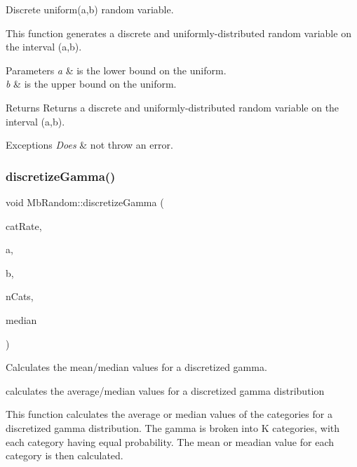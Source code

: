 Discrete uniform(a,b) random variable. 

This function generates a discrete and uniformly-\/distributed random variable on the interval (a,b).


\begin{DoxyParams}{Parameters}
{\em a} & is the lower bound on the uniform. \\
\hline
{\em b} & is the upper bound on the uniform. \\
\hline
\end{DoxyParams}
\begin{DoxyReturn}{Returns}
Returns a discrete and uniformly-\/distributed random variable on the interval (a,b). 
\end{DoxyReturn}

\begin{DoxyExceptions}{Exceptions}
{\em Does} & not throw an error. \\
\hline
\end{DoxyExceptions}
\mbox{\label{class_mb_random_ab8f819e7f62ab1c2b1f165b2d3efe315}} 
\subsubsection{\texorpdfstring{discretizeGamma()}{discretizeGamma()}}
{\footnotesize\ttfamily void Mb\+Random\+::discretize\+Gamma (\begin{DoxyParamCaption}\item[{\mbox{\hyperlink{class_mb_vector}{Mb\+Vector}}$<$ double $>$ \&}]{cat\+Rate,  }\item[{double}]{a,  }\item[{double}]{b,  }\item[{int}]{n\+Cats,  }\item[{bool}]{median }\end{DoxyParamCaption})}



Calculates the mean/median values for a discretized gamma. 

calculates the average/median values for a discretized gamma distribution

This function calculates the average or median values of the categories for a discretized gamma distribution. The gamma is broken into K categories, with each category having equal probability. The mean or meadian value for each category is then calculated.


